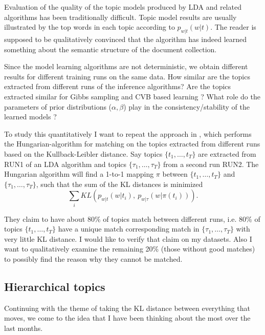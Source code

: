 \documentclass[letterpaper,11pt]{article}
\begin{document}
		Evaluation of the quality of the topic models produced by LDA and related algorithms 
		has been traditionally difficult. 
		Topic model results are usually illustrated by the top words in each topic according to $p_{w|t}(w|t)$.
		The reader is supposed to be qualitatively convinced that the algorithm has indeed
		learned something about the semantic structure of the document collection.
		
		Since the model learning algorithms are not deterministic, we obtain different results 
		for different training runs on the same data.
		How similar are the topics extracted from different runs of the inference algorithms?
		Are the topics extracted similar for Gibbs sampling and CVB based
		learning ?
		What role do the parameters of prior distributions ($\alpha, \beta$) 
		play in the consistency/stability of the learned models \cite{heinrich2005parameter,wallach-rethinking}?
		
		To study this quantitatively I want to repeat the approach in \cite{newman2007distributed}, which 
		performs the Hungarian-algorithm for matching on the topics 
		extracted from different runs based on the Kullback-Leibler distance.
		Say topics $\{t_1,\ldots,t_T \}$ are extracted from RUN1 of an LDA algorithm and
		topics $\{\tau_1,\ldots,\tau_T \}$ from a second run RUN2.
		The Hungarian algorithm will find a 1-to-1 mapping $\pi$ between $\{t_1,\ldots,t_T \}$ and  $\{\tau_1,\ldots,\tau_T \}$,
		such that the sum of the KL distances is minimized
		$$
			\sum_i  {KL}(p_{w|t}(w|t_i),\  p_{w|\tau}(w| \pi(t_i))).
		$$
		
		
		
		They \cite{newman2007distributed} claim to have about 80\% of topics match between different runs,
		i.e. 80\% of topics   $\{t_1,\ldots,t_T \}$ have a unique match corresponding match in $\{\tau_1,\ldots,\tau_T \}$ 
		with very little KL distance.
		I would like to verify that claim on my datasets.
		Also I want to qualitatively examine the remaining 20\% (those without good matches) to possibly find the reason
		why they cannot be matched.
		
		
	\subsection{Hierarchical topics}
	
		Continuing with the theme of taking the KL distance between everything that moves, we
		come to the idea that I have been thinking about the most over the last months.
		
\end{document}
